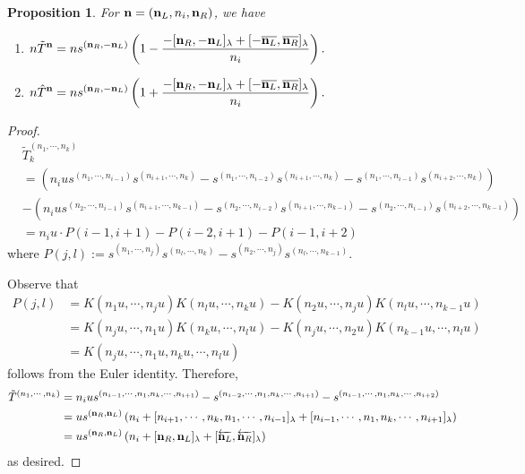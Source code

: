 \documentclass{article}
\theoremstyle{definition}
\theoremstyle{plain}
\newtheorem{proposition}{Proposition}[section]
\theoremstyle{remark}
\numberwithin{equation}{section}
\begin{document}
\begin{proposition}
  For $\mathbf{n} = (\mathbf{n}_L, n_i, \mathbf{n}_R)$, we have
  \begin{enumerate}
    \item $\displaystyle n\tilde{T}^{\mathbf{n}}
    = ns^{(\mathbf{n}_R, - \mathbf{n}_L)} \left( 1 - \frac{- [\mathbf{n}_R, -\mathbf{n}_L]_\lambda + [- \overline{\mathbf{n}_L}, \overline{\mathbf{n}_R}]_\lambda}{n_i} \right).$
    \item $\displaystyle
    n\hat{T}^{\mathbf{n}}
    = ns^{(\mathbf{n}_R, - \mathbf{n}_L)} \left( 1 + \frac{- [\mathbf{n}_R, -\mathbf{n}_L]_\lambda + [- \overline{\mathbf{n}_L}, \overline{\mathbf{n}_R}]_\lambda}{n_i} \right).$
  \end{enumerate}
\end{proposition}
\begin{proof}
  \begin{align*}
    & \tilde{T}_k^{(n_1, \cdots, n_k)} \\
    & = \left(
      n_i u s^{(n_1, \cdots, n_{i-1})} s^{(n_{i+1}, \cdots, n_k)}
    - s^{(n_1, \cdots, n_{i-2})} s^{(n_{i+1}, \cdots, n_k)}
    - s^{(n_1, \cdots, n_{i-1})} s^{(n_{i+2}, \cdots, n_k)}
    \right) \\
    & - \left(
      n_i u s^{(n_2, \cdots, n_{i-1})} s^{(n_{i+1}, \cdots, n_{k-1})}
    - s^{(n_2, \cdots, n_{i-2})} s^{(n_{i+1}, \cdots, n_{k-1})}
    - s^{(n_2, \cdots, n_{i-1})} s^{(n_{i+2}, \cdots, n_{k-1})}
    \right) \\
    & = n_i u \cdot P(i-1, i+1) - P(i-2, i+1) - P(i-1, i+2)
  \end{align*}
  where $P(j, l) := s^{(n_1, \cdots, n_j)} s^{(n_l, \cdots, n_k)} - s^{(n_2, \cdots, n_j)} s^{(n_l, \cdots, n_{k-1})}$.

  Observe that
  \begin{align*}
    P(j, l) & = K(n_1 u, \cdots, n_j u) K(n_l u, \cdots, n_k u) - K(n_2 u, \cdots, n_j u) K(n_l u, \cdots, n_{k-1} u) \\
    & = K(n_j u, \cdots, n_1 u) K(n_k u, \cdots, n_l u) - K(n_j u, \cdots, n_2 u) K(n_{k-1} u, \cdots, n_l u) \\
    & = K(n_j u, \cdots, n_1 u, n_k u, \cdots, n_l u)
  \end{align*}
  follows from the Euler identity.
  Therefore,
  \begin{align*}
    \tilde{T}^{(n_1, \cdots, n_k)}
    & = n_i u s^{(n_{i-1}, \cdots, n_1, n_k, \cdots, n_{i+1})}
    - s^{(n_{i-2}, \cdots, n_1, n_k, \cdots, n_{i+1})}
    - s^{(n_{i-1}, \cdots, n_1, n_k, \cdots, n_{i+2})} \\
    & = u s^{(\mathbf{n}_R, \mathbf{n}_L)}
    \left( n_i + [n_{i+1}, \cdots, n_k, n_1, \cdots, n_{i-1}]_\lambda
    + [n_{i-1}, \cdots, n_1, n_k, \cdots, n_{i+1}]_\lambda \right) \\
    & = u s^{(\mathbf{n}_R, \mathbf{n}_L)} \left( n_i + [\mathbf{n}_R, \mathbf{n}_L]_\lambda + [\overleftarrow{\mathbf{n}_L}, \overleftarrow{\mathbf{n}_R}]_\lambda \right)
  \end{align*}
  as desired.


\end{proof}
\end{document}
